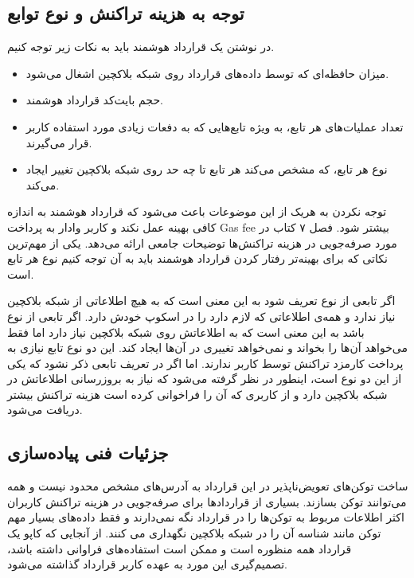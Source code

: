 \subsection{توجه به هزینه تراکنش و نوع توابع}
در نوشتن یک قرارداد هوشمند باید به نکات زیر توجه کنیم.
\begin{itemize}
  \item
میزان حافظه‌ای که توسط داده‌های قرارداد روی شبکه بلاکچین اشغال می‌شود.
  \item
حجم بایت‌کد قرارداد هوشمند.
  \item
تعداد عملیات‌های هر تابع، به ویژه تابع‌هایی که به دفعات زیادی مورد استفاده کاربر قرار می‌گیرند.
  \item
نوع هر تابع، که مشخص می‌کند هر تابع تا چه حد روی شبکه بلاکچین تغییر ایجاد می‌کند.
\end{itemize}

توجه نکردن به هریک از این موضوعات باعث می‌شود که قرارداد هوشمند به اندازه کافی بهینه عمل نکند و کاربر وادار به پرداخت
\gls{Gas fee}
بیشتر شود. فصل ۷ کتاب
\cite{MasteringEthereum}
در مورد صرفه‌جویی در هزینه تراکنش‌ها توضیحات جامعی ارائه می‌دهد.
یکی از مهم‌ترین نکاتی که برای بهینه‌تر رفتار کردن قرارداد هوشمند
باید به آن توجه کنیم نوع هر تابع است.

اگر تابعی از نوع
تعریف شود به این معنی است که به هیچ اطلاعاتی از شبکه بلاکچین نیاز ندارد
و همه‌ی اطلاعاتی که لازم دارد را در اسکوپ
خودش دارد. اگر تابعی از نوع
باشد به این معنی است که به اطلاعاتش روی شبکه بلاکچین نیاز دارد
اما فقط می‌خواهد آن‌ها را بخواند و نمی‌خواهد تغییری در آن‌ها ایجاد کند.
این دو نوع تابع نیازی به پرداخت کارمزد تراکنش توسط کاربر ندارند.
اما اگر در تعریف تابعی ذکر نشود که یکی از این دو نوع است، اینطور در نظر گرفته می‌شود
که نیاز به بروزرسانی اطلاعاتش در شبکه بلاکچین دارد
و از کاربری که آن را فراخوانی کرده است هزینه تراکنش بیشتر دریافت می‌شود.


\subsection{جزئیات فنی پیاده‌سازی}
ساخت توکن‌های تعویض‌ناپذیر در این قرارداد به آدرس‌های مشخص محدود نیست و همه می‌توانند توکن بسازند.
بسیاری از قراردادها برای صرفه‌جویی در هزینه تراکنش کاربران اکثر اطلاعات مربوط به توکن‌ها را در قرارداد نگه نمی‌دارند
و فقط داده‌های بسیار مهم توکن مانند شناسه آن را در شبکه بلاکچین نگهداری می کنند.
از آنجایی که کاپو یک قرارداد همه منظوره است و ممکن است استفاده‌های فراوانی داشته باشد،
تصمیم‌گیری این مورد به عهده کاربر قرارداد گذاشته می‌شود.

